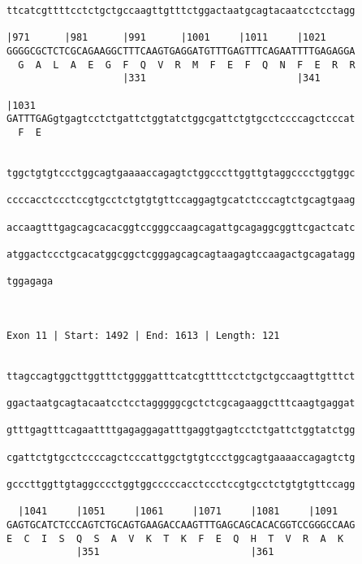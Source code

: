 \documentclass{article}
\begin{document}
\begin{Verbatim}
ttcatcgttttcctctgctgccaagttgtttctggactaatgcagtacaatcctcctagg
                                                            
|971      |981      |991      |1001     |1011     |1021     
GGGGCGCTCTCGCAGAAGGCTTTCAAGTGAGGATGTTTGAGTTTCAGAATTTTGAGAGGA
  G  A  L  A  E  G  F  Q  V  R  M  F  E  F  Q  N  F  E  R  R
                    |331                          |341      
  
|1031                                                       
GATTTGAGgtgagtcctctgattctggtatctggcgattctgtgcctccccagctcccat
  F  E                                                      
                                                            
  
tggctgtgtccctggcagtgaaaaccagagtctggcccttggttgtaggcccctggtggc
                                                            
ccccacctccctccgtgcctctgtgtgttccaggagtgcatctcccagtctgcagtgaag
                                                            
accaagtttgagcagcacacggtccgggccaagcagattgcagaggcggttcgactcatc
                                                            
atggactccctgcacatggcggctcgggagcagcagtaagagtccaagactgcagatagg
                                                            
tggagaga
        
        
 
Exon 11 | Start: 1492 | End: 1613 | Length: 121


ttagccagtggcttggtttctggggatttcatcgttttcctctgctgccaagttgtttct
                                                            
ggactaatgcagtacaatcctcctagggggcgctctcgcagaaggctttcaagtgaggat
                                                            
gtttgagtttcagaattttgagaggagatttgaggtgagtcctctgattctggtatctgg
                                                            
cgattctgtgcctccccagctcccattggctgtgtccctggcagtgaaaaccagagtctg
                                                            
gcccttggttgtaggcccctggtggcccccacctccctccgtgcctctgtgtgttccagg
                                                            
  |1041     |1051     |1061     |1071     |1081     |1091   
GAGTGCATCTCCCAGTCTGCAGTGAAGACCAAGTTTGAGCAGCACACGGTCCGGGCCAAG
E  C  I  S  Q  S  A  V  K  T  K  F  E  Q  H  T  V  R  A  K  
            |351                          |361              
  

\end{Verbatim}
\end{document}
